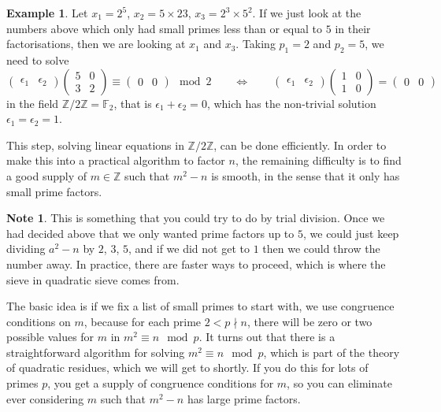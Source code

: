 \documentclass{article}
\newcommand{\F}{\mathbb{F}}
\newcommand{\Z}{\mathbb{Z}}
\newcommand{\two}[2]{\begin{pmatrix} #1 \\ #2 \end{pmatrix}}
\theoremstyle{definition}\newtheorem{definition}{Definition}
\theoremstyle{definition}\newtheorem*{remark}{Remark}
\theoremstyle{definition}\newtheorem*{example}{Example}
\theoremstyle{definition}\newtheorem*{note}{Note}
\begin{document}
\begin{example}
Let $ x_1 = 2^5 $, $ x_2 = 5 \times 23 $, $ x_3 = 2^3 \times 5^2 $. If we just look at the numbers above which only had small primes less than or equal to $ 5 $ in their factorisations, then we are looking at $ x_1 $ and $ x_3 $. Taking $ p_1 = 2 $ and $ p_2 = 5 $, we need to solve
$$ \begin{pmatrix} \epsilon_1 & \epsilon_2 \end{pmatrix} \two{5 & 0}{3 & 2} \equiv \begin{pmatrix} 0 & 0 \end{pmatrix} \mod 2 \qquad \iff \qquad \begin{pmatrix} \epsilon_1 & \epsilon_2 \end{pmatrix} \two{1 & 0}{1 & 0} = \begin{pmatrix} 0 & 0 \end{pmatrix} $$
in the field $ \Z / 2\Z = \F_2 $, that is $ \epsilon_1 + \epsilon_2 = 0 $, which has the non-trivial solution $ \epsilon_1 = \epsilon_2 = 1 $.
\end{example}

This step, solving linear equations in $ \Z / 2\Z $, can be done efficiently. In order to make this into a practical algorithm to factor $ n $, the remaining difficulty is to find a good supply of $ m \in \Z $ such that $ m^2 - n $ is smooth, in the sense that it only has small prime factors.

\begin{note}
This is something that you could try to do by trial division. Once we had decided above that we only wanted prime factors up to $ 5 $, we could just keep dividing $ a^2 - n $ by $ 2 $, $ 3 $, $ 5 $, and if we did not get to $ 1 $ then we could throw the number away. In practice, there are faster ways to proceed, which is where the sieve in quadratic sieve comes from.
\end{note}

The basic idea is if we fix a list of small primes to start with, we use congruence conditions on $ m $, because for each prime $ 2 < p \nmid n $, there will be zero or two possible values for $ m $ in $ m^2 \equiv n \mod p $. It turns out that there is a straightforward algorithm for solving $ m^2 \equiv n \mod p $, which is part of the theory of quadratic residues, which we will get to shortly. If you do this for lots of primes $ p $, you get a supply of congruence conditions for $ m $, so you can eliminate ever considering $ m $ such that $ m^2 - n $ has large prime factors.
\end{document}
